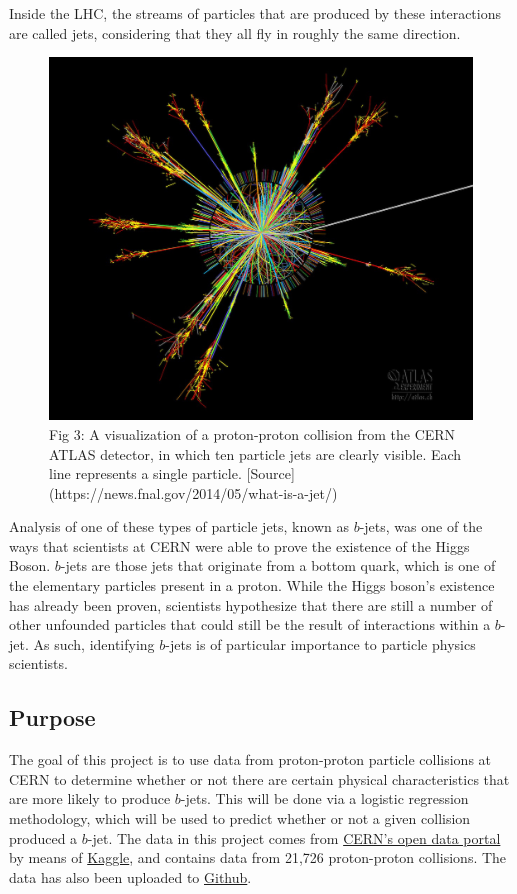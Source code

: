 \documentclass[
]{article}
\begin{document}
Inside the LHC, the streams of particles that are produced by these
interactions are called jets, considering that they all fly in roughly
the same direction.

\begin{figure}

{\centering \includegraphics[width=0.6\linewidth]{Figures/Particle_Collision_Jets} 

}

\caption{Fig 3: A visualization of a proton-proton collision from the CERN ATLAS detector, in which ten particle jets are clearly visible. Each line represents a single particle. [Source](https://news.fnal.gov/2014/05/what-is-a-jet/)}\label{fig:Fig3}
\end{figure}

Analysis of one of these types of particle jets, known as \(b\)-jets,
was one of the ways that scientists at CERN were able to prove the
existence of the Higgs Boson. \(b\)-jets are those jets that originate
from a bottom quark, which is one of the elementary particles present in
a proton. While the Higgs boson's existence has already been proven,
scientists hypothesize that there are still a number of other unfounded
particles that could still be the result of interactions within a
\(b\)-jet. As such, identifying \(b\)-jets is of particular importance
to particle physics scientists.

\hypertarget{purpose}{%
\subsection{Purpose}\label{purpose}}

The goal of this project is to use data from proton-proton particle
collisions at CERN to determine whether or not there are certain
physical characteristics that are more likely to produce \(b\)-jets.
This will be done via a logistic regression methodology, which will be
used to predict whether or not a given collision produced a \(b\)-jet.
The data in this project comes from
\href{http://opendata.cern.ch/record/554}{CERN's open data portal} by
means of
\href{https://www.kaggle.com/datasets/fedesoriano/multijet-primary-dataset?q=CERN}{Kaggle},
and contains data from 21,726 proton-proton collisions. The data has
also been uploaded to
\href{https://raw.githubusercontent.com/williamzjasmine/CUNY_SPS_DS/master/DATA_606/Final_Project/MultiJetRun2010B.csv}{Github}.
\end{document}
